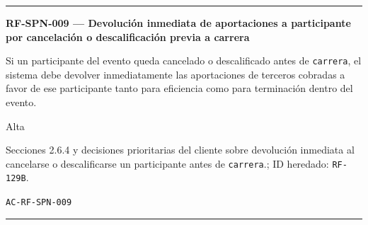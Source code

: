 \documentclass[10pt,letterpaper]{article}
\begin{document}
\vspace{0.25em}\hrule\vspace{0.65em}
\noindent\textbf{RF-SPN-009 --- Devolución inmediata de aportaciones a participante por cancelación o descalificación previa a carrera}\par
\begin{description}[style=nextline,leftmargin=3.15cm,labelwidth=2.8cm,font=\normalfont\bfseries]
\item[Obligación] Si un participante del evento queda cancelado o descalificado antes de \texttt{carrera}, el sistema debe devolver inmediatamente las aportaciones de terceros cobradas a favor de ese participante tanto para eficiencia como para terminación dentro del evento.
\item[Prioridad] Alta
\item[Procedencia] Secciones 2.6.4 y decisiones prioritarias del cliente sobre devolución inmediata al cancelarse o descalificarse un participante antes de \texttt{carrera}.; ID heredado: \texttt{RF-129B}.
\item[Verificación] \texttt{AC-RF-SPN-009}
\end{description}
\vspace{0.25em}\hrule\vspace{0.65em}
\end{document}
